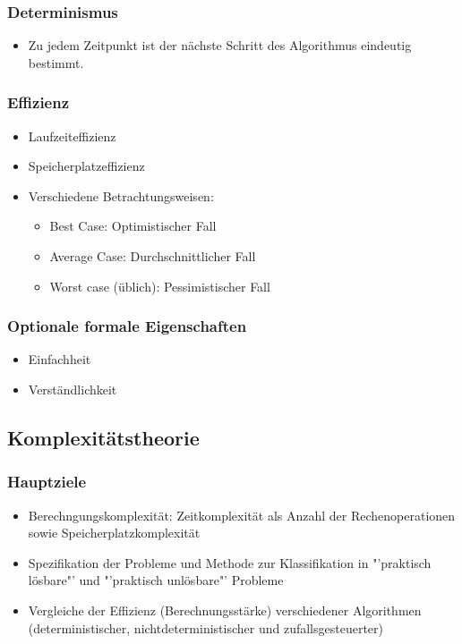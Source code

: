 \subsubsection{Determinismus}
    \begin{itemize}
	    \item Zu jedem Zeitpunkt ist der nächste Schritt des Algorithmus eindeutig bestimmt.
    \end{itemize}
\subsubsection{Effizienz}
    \begin{itemize}
	    \item Laufzeiteffizienz
	    \item Speicherplatzeffizienz
	    \item Verschiedene Betrachtungsweisen:
	    \begin{itemize}
	        \item Best Case: Optimistischer Fall
	        \item Average Case: Durchschnittlicher Fall
	        \item Worst case (üblich): Pessimistischer Fall
	    \end{itemize}
    \end{itemize}
\subsubsection{Optionale formale Eigenschaften}
    \begin{itemize}
	    \item Einfachheit
	    \item Verständlichkeit
    \end{itemize}


\subsection{Komplexitätstheorie}
\subsubsection{Hauptziele}
    \begin{itemize}
        \item Berechngungskomplexität: Zeitkomplexität als Anzahl der Rechenoperationen sowie Speicherplatzkomplexität
        \item Spezifikation der Probleme und Methode zur Klassifikation in "'praktisch lösbare"' und "'praktisch unlösbare"' Probleme
        \item Vergleiche der Effizienz (Berechnungsstärke) verschiedener Algorithmen (deterministischer, nichtdeterministischer und zufallsgesteuerter)
    \end{itemize}
